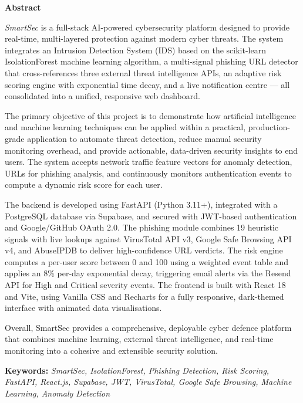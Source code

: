 \newpage
\thispagestyle{empty}

\begin{center}
\textbf{\LARGE{Abstract}}
\end{center}

{
\textit{SmartSec} is a full-stack AI-powered cybersecurity platform designed to provide real-time, multi-layered protection against modern cyber threats. The system integrates an Intrusion Detection System (IDS) based on the scikit-learn IsolationForest machine learning algorithm, a multi-signal phishing URL detector that cross-references three external threat intelligence APIs, an adaptive risk scoring engine with exponential time decay, and a live notification centre --- all consolidated into a unified, responsive web dashboard.

The primary objective of this project is to demonstrate how artificial intelligence and machine learning techniques can be applied within a practical, production-grade application to automate threat detection, reduce manual security monitoring overhead, and provide actionable, data-driven security insights to end users. The system accepts network traffic feature vectors for anomaly detection, URLs for phishing analysis, and continuously monitors authentication events to compute a dynamic risk score for each user.

The backend is developed using FastAPI (Python 3.11+), integrated with a PostgreSQL database via Supabase, and secured with JWT-based authentication and Google/GitHub OAuth 2.0. The phishing module combines 19 heuristic signals with live lookups against VirusTotal API v3, Google Safe Browsing API v4, and AbuseIPDB to deliver high-confidence URL verdicts. The risk engine computes a per-user score between 0 and 100 using a weighted event table and applies an 8\% per-day exponential decay, triggering email alerts via the Resend API for High and Critical severity events. The frontend is built with React 18 and Vite, using Vanilla CSS and Recharts for a fully responsive, dark-themed interface with animated data visualisations.

Overall, SmartSec provides a comprehensive, deployable cyber defence platform that combines machine learning, external threat intelligence, and real-time monitoring into a cohesive and extensible security solution.
}

\vspace{0.5cm}

\textbf{Keywords:} \textit{SmartSec, IsolationForest, Phishing Detection, Risk Scoring, FastAPI, React.js, Supabase, JWT, VirusTotal, Google Safe Browsing, Machine Learning, Anomaly Detection}
